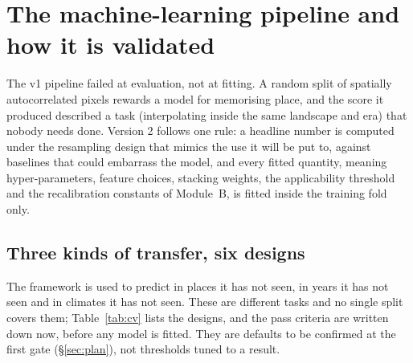 \section{The machine-learning pipeline and how it is validated}\label{sec:ml}

The v1 pipeline failed at evaluation, not at fitting. A random split of spatially autocorrelated pixels rewards a model for memorising place, and the score it produced described a task (interpolating inside the same landscape and era) that nobody needs done. Version 2 follows one rule: a headline number is computed under the resampling design that mimics the use it will be put to, against baselines that could embarrass the model, and every fitted quantity, meaning hyper-parameters, feature choices, stacking weights, the applicability threshold and the recalibration constants of Module~B, is fitted inside the training fold only.

\subsection{Three kinds of transfer, six designs}
The framework is used to predict in places it has not seen, in years it has not seen and in climates it has not seen. These are different tasks and no single split covers them; Table~\ref{tab:cv} lists the designs, and the pass criteria are written down now, before any model is fitted. They are defaults to be confirmed at the first gate (\S\ref{sec:plan}), not thresholds tuned to a result.

